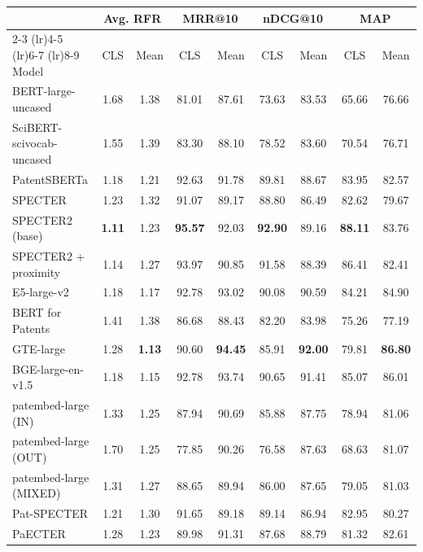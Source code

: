 \begin{tabular}{l cc cc cc cc}
    \toprule
    & \multicolumn{2}{c}{Avg. RFR} & \multicolumn{2}{c}{MRR@10} & \multicolumn{2}{c}{nDCG@10} & \multicolumn{2}{c}{MAP} \\
    \cmidrule(lr){2-3} \cmidrule(lr){4-5} \cmidrule(lr){6-7} \cmidrule(lr){8-9}
Model & CLS & Mean & CLS & Mean & CLS & Mean & CLS & Mean \\
    \midrule
    BERT-large-uncased & 1.68 & 1.38 & 81.01 & 87.61 & 73.63 & 83.53 & 65.66 & 76.66 \\
    SciBERT-scivocab-uncased & 1.55 & 1.39 & 83.30 & 88.10 & 78.52 & 83.60 & 70.54 & 76.71 \\
    PatentSBERTa & 1.18 & 1.21 & 92.63 & 91.78 & 89.81 & 88.67 & 83.95 & 82.57 \\
    SPECTER & 1.23 & 1.32 & 91.07 & 89.17 & 88.80 & 86.49 & 82.62 & 79.67 \\
    SPECTER2 (base) & \textbf{1.11} & 1.23 & \textbf{95.57} & 92.03 & \textbf{92.90} & 89.16 & \textbf{88.11} & 83.76 \\
    SPECTER2 + proximity & 1.14 & 1.27 & 93.97 & 90.85 & 91.58 & 88.39 & 86.41 & 82.41 \\
    E5-large-v2 & 1.18 & 1.17 & 92.78 & 93.02 & 90.08 & 90.59 & 84.21 & 84.90 \\
    BERT for Patents & 1.41 & 1.38 & 86.68 & 88.43 & 82.20 & 83.98 & 75.26 & 77.19 \\
    GTE-large & 1.28 & \textbf{1.13} & 90.60 & \textbf{94.45} & 85.91 & \textbf{92.00} & 79.81 & \textbf{86.80} \\
    BGE-large-en-v1.5 & 1.18 & 1.15 & 92.78 & 93.74 & 90.65 & 91.41 & 85.07 & 86.01 \\
    patembed-large (IN) & 1.33 & 1.25 & 87.94 & 90.69 & 85.88 & 87.75 & 78.94 & 81.06 \\
    patembed-large (OUT) & 1.70 & 1.25 & 77.85 & 90.26 & 76.58 & 87.63 & 68.63 & 81.07 \\
    patembed-large (MIXED) & 1.31 & 1.27 & 88.65 & 89.94 & 86.00 & 87.65 & 79.05 & 81.03 \\
    Pat-SPECTER & 1.21 & 1.30 & 91.65 & 89.18 & 89.14 & 86.94 & 82.95 & 80.27 \\
    PaECTER & 1.28 & 1.23 & 89.98 & 91.31 & 87.68 & 88.79 & 81.32 & 82.61 \\
    \bottomrule
\end{tabular}
